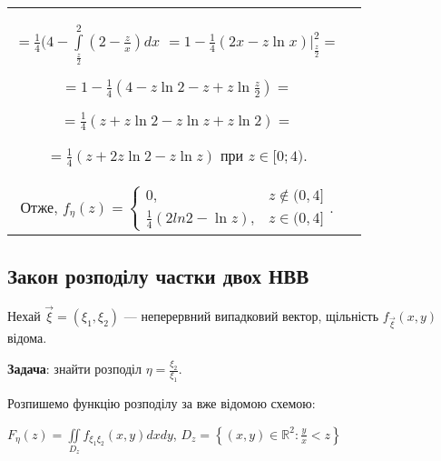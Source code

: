 \begin{example}
\begin{tabular}{c p{8.5 cm}}
            $=\frac{1}{4}(4 - \int\limits_{\frac{z}{2}}^2 
            (2 -\frac{z}{x})dx $
            $= 1 - \frac{1}{4}\left.(2x - z \ln x)\right|_{\frac{z}{2}}^2 = $
            
            $= 1 - \frac{1}{4}(4 - z\ln2 - z + z\ln\frac{z}{2}) =$

            $= \frac{1}{4}(z + z\ln2 - z\ln z + z\ln2) = $

            $= \frac{1}{4}(z + 2z\ln2 - z\ln z)$ 
            при $z\in [0; 4)$. \\
            Отже, $f_{\eta}(z) = 
            \begin{cases}
                0, & z \notin (0, 4] \\
                \frac{1}{4}(2ln2 - \ln z), & z \in (0, 4]
            \end{cases}$.
        \end{tabular}
\end{example}

\subsection{Закон розподілу частки двох НВВ}

Нехай $\vec{\xi} = (\xi_1, \xi_2)$ --- неперервний випадковий вектор, щільність
$f_{\vec{\xi}}(x, y)$ відома.

\noindent\textbf{Задача}: знайти розподіл $\eta = \frac{\xi_2}{\xi_1}$.

Розпишемо функцію розподілу за вже відомою схемою:

$F_\eta(z) = \iint\limits_{D_z}f_{\xi_1\xi_2}(x, y)dxdy$, $D_z = \left\{(x, y) \in 
\mathbb{R}^2 : \frac{y}{x} < z\right\}$

